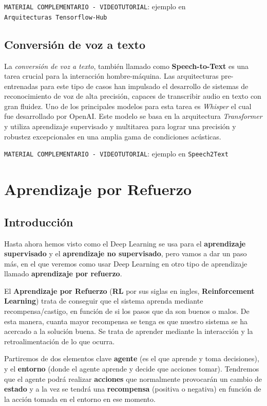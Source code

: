 \documentclass[
  a4paper,
  DIV=11,
  numbers=noendperiod]{scrreprt}
\begin{document}
\texttt{MATERIAL\ COMPLEMENTARIO\ -\ VIDEOTUTORIAL}: ejemplo en
\texttt{Arquitecturas\ Tensorflow-Hub}

\subsection{Conversión de voz a
texto}\label{conversiuxf3n-de-voz-a-texto}

La \emph{conversión de voz a texto}, también llamado como
\textbf{Speech-to-Text} es una tarea crucial para la interacción
hombre-máquina. Las arquitecturas pre-entrenadas para este tipo de casos
han impulsado el desarrollo de sistemas de reconocimiento de voz de alta
precisión, capaces de transcribir audio en texto con gran fluidez. Uno
de los principales modelos para esta tarea es \emph{Whisper} el cual fue
desarrollado por OpenAI. Este modelo se basa en la arquitectura
\emph{Transformer} y utiliza aprendizaje supervisado y multitarea para
lograr una precisión y robustez excepcionales en una amplia gama de
condiciones acústicas.

\texttt{MATERIAL\ COMPLEMENTARIO\ -\ VIDEOTUTORIAL}: ejemplo en
\texttt{Speech2Text}

\section{Aprendizaje por Refuerzo}\label{aprendizaje-por-refuerzo}

\subsection{Introducción}\label{introducciuxf3n-3}

Hasta ahora hemos visto como el Deep Learning se usa para el
\textbf{aprendizaje supervisado} y el \textbf{aprendizaje no
supervisado}, pero vamos a dar un paso más, en el que veremos como usar
Deep Learning en otro tipo de aprendizaje llamado \textbf{aprendizaje
por refuerzo}.

El \textbf{Aprendizaje por Refuerzo} (\textbf{RL} por sus siglas en
ingles, \textbf{Reinforcement Learning}) trata de conseguir que el
sistema aprenda mediante recompensa/castigo, en función de si los pasos
que da son buenos o malos. De esta manera, cuanta mayor recompensa se
tenga es que nuestro sistema se ha acercado a la solución buena. Se
trata de aprender mediante la interacción y la retroalimentación de lo
que ocurra.

Partiremos de dos elementos clave \textbf{agente} (es el que aprende y
toma decisiones), y el \textbf{entorno} (donde el agente aprende y
decide que acciones tomar). Tendremos que el agente podrá realizar
\textbf{acciones} que normalmente provocarán un cambio de
\textbf{estado} y a la vez se tendrá una \textbf{recompensa} (positiva o
negativa) en función de la acción tomada en el entorno en ese momento.
\end{document}
